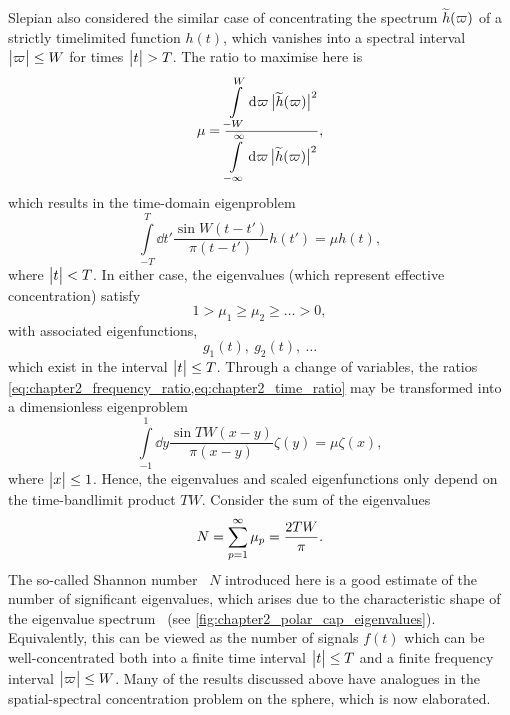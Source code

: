 Slepian \etal{} also considered the similar case of concentrating the spectrum \(\widetilde{h}(\varpi)\) of a strictly timelimited function \(h(t)\), which vanishes into a spectral interval \(\big\lvert\varpi\big\rvert \leq W\) for times \(\big\lvert t\big\rvert > T\).
The ratio to maximise here is
%
\begin{equation}\label{eq:chapter2_time_ratio}
	\mu
	= \frac{\displaystyle\int\limits_{-W}^{W} \dd{\varpi} \big\lvert\widetilde{h}(\varpi)\big\rvert^{2}}
	{\displaystyle\int\limits_{-\infty}^{\infty} \dd{\varpi} \big\lvert\widetilde{h}(\varpi)\big\rvert^{2}},
\end{equation}
%
which results in the time-domain eigenproblem
%
\begin{equation}\label{eq:chapter2_time_eigenproblem}
	\int\limits_{-T}^{T} \dd{t'} \frac{\sin{W(t-t')}}{\pi(t-t')} h(t')
	= \mu h(t),
\end{equation}
%
where \(\big\lvert t\big\rvert < T\).
In either case, the eigenvalues (which represent effective concentration) satisfy
%
\begin{equation}
	1 > \mu_{1} \geq \mu_{2} \geq \ldots > 0, %
\end{equation}
%
with associated eigenfunctions, \eg{}
%
\begin{equation}
	g_{1}(t),\ g_{2}(t),\ \ldots
\end{equation}
%
which exist in the interval \(\big\lvert t\big\rvert \leq T\).
Through a change of variables, the ratios \cref{eq:chapter2_frequency_ratio,eq:chapter2_time_ratio} may be transformed into a dimensionless eigenproblem
%
\begin{equation}
	\int\limits_{-1}^{1} \dd{y} \frac{\sin{TW(x-y)}}{\pi(x-y)} \zeta(y)
	= \mu \zeta(x),
\end{equation}
%
where \(\big\lvert x\big\rvert \leq 1\).
Hence, the eigenvalues and scaled eigenfunctions only depend on the time-bandlimit product \(TW\).
Consider the sum of the eigenvalues
%
\begin{equation}
	N
	= \sum\limits_{p=1}^{\infty} {\mu}_{p}
	= \frac{2TW}{\pi}.
\end{equation}
%
The so-called Shannon number~\cite{Percival1993} \(N\) introduced here is a good estimate of the number of significant eigenvalues, which arises due to the characteristic shape of the eigenvalue spectrum~\cite{Landau1965,Slepian1965} (see \cref{fig:chapter2_polar_cap_eigenvalues}).
Equivalently, this can be viewed as the number of signals \(f(t)\) which can be well-concentrated both into a finite time interval \(\big\lvert t\big\rvert \leq T\) and a finite frequency interval \(\big\lvert\varpi\big\rvert \leq W\).
Many of the results discussed above have analogues in the spatial-spectral concentration problem on the sphere, which is now elaborated.

